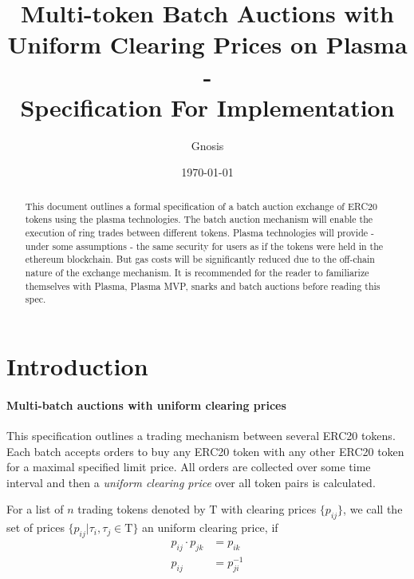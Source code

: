\documentclass[11pt,parskip=full]{scrartcl}%
\title{
  Multi-token Batch Auctions with Uniform Clearing Prices on Plasma\\
  - \\
  \Large Specification For Implementation}
\author{Gnosis}
\date{\today}
\newcommand{\Tau}{\mathrm{T}}
\newcommand*{\erc}{ERC20 }
\begin{document}
\maketitle


\begin{abstract}

This document outlines a formal specification of a batch auction exchange of ERC20 tokens using the plasma technologies. 
The batch auction mechanism will enable the execution of ring trades between different tokens. 
Plasma technologies will provide - under some assumptions - the same security for users as if the tokens were held in the ethereum blockchain. 
But gas costs will be significantly reduced due to the off-chain nature of the exchange mechanism. 
It is recommended for the reader to familiarize themselves with Plasma\cite{plasma}, Plasma MVP\cite{MVP}, snarks\cite{snarks} and batch auctions\cite{batch} before reading this spec. 

\end{abstract}

\tableofcontents

\newpage
\section{Introduction}
\label{sec:introduction}

\paragraph{Multi-batch auctions with uniform clearing prices}

This specification outlines a trading mechanism between several \erc tokens. Each batch accepts orders to buy any \erc token with any other \erc token for a maximal specified limit price. All orders are collected over some time interval and then a \emph{uniform clearing price} over all token pairs is calculated. 

For a list of $n$ trading tokens denoted by $\Tau$ with clearing prices $\{p_{ij}\}$, we call the set of prices $\{p_{ij}| \tau_i, \tau_j \in \Tau\}$ an uniform clearing price, if
\begin{align} \label{arbitrage_free}
  p_{ij} \cdot p_{jk} &= p_{ik}\\
  p_{ij} &= p_{ji}^{-1}
\end{align}
\end{document}
